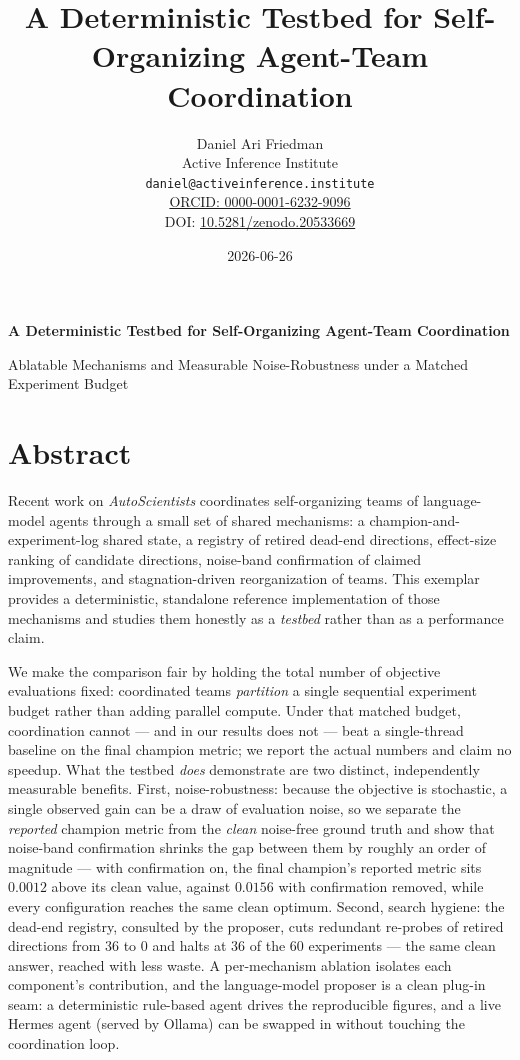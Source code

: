\documentclass[
]{article}
\author{}
\date{}
\title{A Deterministic Testbed for Self-Organizing Agent-Team Coordination}
\author{Daniel Ari Friedman\\\footnotesize{Active Inference Institute}\\\footnotesize{\texttt{daniel@activeinference.institute}}\\\footnotesize{\href{https://orcid.org/0000-0001-6232-9096}{ORCID: 0000-0001-6232-9096}} \\ \footnotesize{DOI: \href{https://doi.org/10.5281/zenodo.20533669}{10.5281/zenodo.20533669}}}
\date{2026-06-26}
\begin{document}
\begin{titlepage}
\centering
\vspace*{2cm}
{\LARGE\bfseries A Deterministic Testbed for Self-Organizing Agent-Team Coordination\par}
\vspace{0.75em}
{\large Ablatable Mechanisms and Measurable Noise-Robustness under a Matched Experiment Budget\par}
\vfill
\makeatletter
{\@author\par}
\vspace{1em}
{\@date\par}
\makeatother
\vfill
\end{titlepage}
\thispagestyle{empty}
\tableofcontents
\newpage


\section{Abstract}\label{sec:abstract}

Recent work on \emph{AutoScientists} \citep{gao2026autoscientists}
coordinates self-organizing teams of language-model agents through a
small set of shared mechanisms: a champion-and-experiment-log shared
state, a registry of retired dead-end directions, effect-size ranking of
candidate directions, noise-band confirmation of claimed improvements,
and stagnation-driven reorganization of teams. This exemplar provides a
deterministic, standalone reference implementation of those mechanisms
and studies them honestly as a \emph{testbed} rather than as a
performance claim.

We make the comparison fair by holding the total number of objective
evaluations fixed: coordinated teams \emph{partition} a single
sequential experiment budget rather than adding parallel compute. Under
that matched budget, coordination cannot --- and in our results does not
--- beat a single-thread baseline on the final champion metric; we
report the actual numbers and claim no speedup. What the testbed
\emph{does} demonstrate are two distinct, independently measurable
benefits. First, noise-robustness: because the objective is stochastic,
a single observed gain can be a draw of evaluation noise, so we separate
the \emph{reported} champion metric from the \emph{clean} noise-free
ground truth and show that noise-band confirmation shrinks the gap
between them by roughly an order of magnitude --- with confirmation on,
the final champion's reported metric sits \(0.0012\) above its clean
value, against \(0.0156\) with confirmation removed, while every
configuration reaches the same clean optimum. Second, search hygiene:
the dead-end registry, consulted by the proposer, cuts redundant
re-probes of retired directions from \(36\) to \(0\) and halts at \(36\)
of the \(60\) experiments --- the same clean answer, reached with less
waste. A per-mechanism ablation isolates each component's contribution,
and the language-model proposer is a clean plug-in seam: a deterministic
rule-based agent drives the reproducible figures, and a live Hermes
agent (served by Ollama) can be swapped in without touching the
coordination loop.
\end{document}
